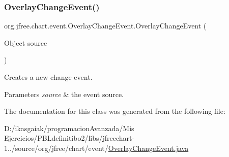 \subsubsection{\texorpdfstring{Overlay\+Change\+Event()}{OverlayChangeEvent()}}
{\footnotesize\ttfamily org.\+jfree.\+chart.\+event.\+Overlay\+Change\+Event.\+Overlay\+Change\+Event (\begin{DoxyParamCaption}\item[{Object}]{source }\end{DoxyParamCaption})}

Creates a new change event.


\begin{DoxyParams}{Parameters}
{\em source} & the event source. \\
\hline
\end{DoxyParams}


The documentation for this class was generated from the following file\+:\begin{DoxyCompactItemize}
\item 
D\+:/ikasgaiak/programacion\+Avanzada/\+Mis Ejercicios/\+P\+B\+Ldefinitibo2/libs/jfreechart-\/1../source/org/jfree/chart/event/\mbox{\hyperlink{_overlay_change_event_8java}{Overlay\+Change\+Event.\+java}}\end{DoxyCompactItemize}
